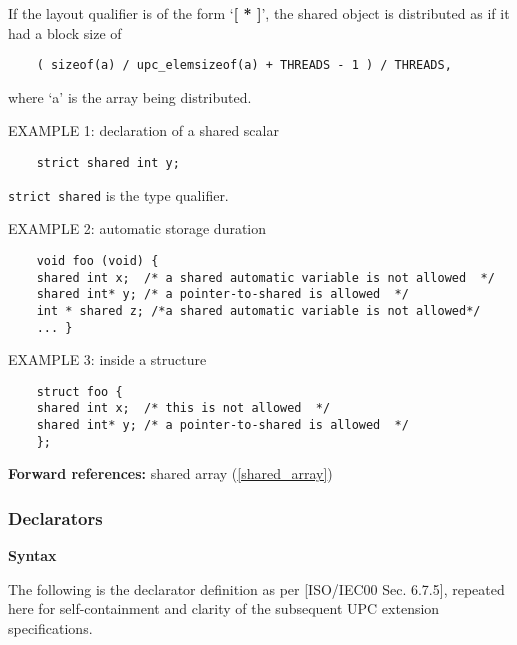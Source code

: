 \np If the layout qualifier is of the form `{\bf [ * ]}',
    the shared object is distributed as if it had a block size of

\begin{verbatim}
    ( sizeof(a) / upc_elemsizeof(a) + THREADS - 1 ) / THREADS, 
\end{verbatim}

    where `a' is the array being distributed. 

\np EXAMPLE 1: declaration of a shared scalar 

\begin{verbatim}
    strict shared int y;
\end{verbatim}

    {\tt strict shared} is the type qualifier.

\np EXAMPLE 2: automatic storage duration 

\begin{verbatim}
    void foo (void) { 
    shared int x;  /* a shared automatic variable is not allowed  */ 
    shared int* y; /* a pointer-to-shared is allowed  */ 
    int * shared z; /*a shared automatic variable is not allowed*/ 
    ... } 
\end{verbatim}

\np EXAMPLE 3: inside a structure  

\begin{verbatim}
    struct foo { 
    shared int x;  /* this is not allowed  */ 
    shared int* y; /* a pointer-to-shared is allowed  */ 
    }; 
\end{verbatim}

{\bf Forward references:} shared array (\ref{shared_array})
\subsubsection{Declarators}
\label{declarator}

{\bf Syntax} 

\npf The following is the declarator definition as per
    [ISO/IEC00 Sec. 6.7.5], repeated here for self-containment and
    clarity of the subsequent UPC extension specifications.




\hspace{3em}{\em identifier }

